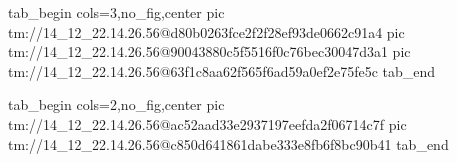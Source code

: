  
 
 
 
 

\qqSecOrig


\ifcmt
  tab_begin cols=3,no_fig,center
    pic tm://14_12_22.14.26.56@d80b0263fce2f2f28ef93de0662c91a4
    pic tm://14_12_22.14.26.56@90043880c5f5516f0c76bec30047d3a1
    pic tm://14_12_22.14.26.56@63f1c8aa62f565f6ad59a0ef2e75fe5c
  tab_end
\fi


\ifcmt
  tab_begin cols=2,no_fig,center
    pic tm://14_12_22.14.26.56@ac52aad33e2937197eefda2f06714c7f
    pic tm://14_12_22.14.26.56@c850d641861dabe333e8fb6f8bc90b41
  tab_end
\fi

